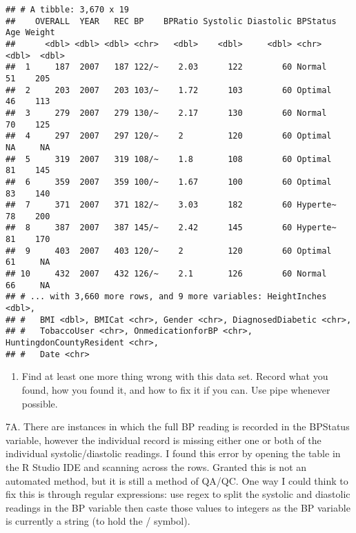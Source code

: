 \documentclass[
]{article}
\newenvironment{Shaded}{\begin{snugshade}}{\end{snugshade}}
\newcommand{\KeywordTok}[1]{\textcolor[rgb]{0.13,0.29,0.53}{\textbf{#1}}}
\newcommand{\NormalTok}[1]{#1}
\newcommand{\OperatorTok}[1]{\textcolor[rgb]{0.81,0.36,0.00}{\textbf{#1}}}
\newcommand{\StringTok}[1]{\textcolor[rgb]{0.31,0.60,0.02}{#1}}
\providecommand{\tightlist}{%
  \setlength{\itemsep}{0pt}\setlength{\parskip}{0pt}}
\begin{document}
\begin{Shaded}
\end{Shaded}

\begin{verbatim}
## # A tibble: 3,670 x 19
##    OVERALL  YEAR   REC BP    BPRatio Systolic Diastolic BPStatus   Age Weight
##      <dbl> <dbl> <dbl> <chr>   <dbl>    <dbl>     <dbl> <chr>    <dbl>  <dbl>
##  1     187  2007   187 122/~    2.03      122        60 Normal      51    205
##  2     203  2007   203 103/~    1.72      103        60 Optimal     46    113
##  3     279  2007   279 130/~    2.17      130        60 Normal      70    125
##  4     297  2007   297 120/~    2         120        60 Optimal     NA     NA
##  5     319  2007   319 108/~    1.8       108        60 Optimal     81    145
##  6     359  2007   359 100/~    1.67      100        60 Optimal     83    140
##  7     371  2007   371 182/~    3.03      182        60 Hyperte~    78    200
##  8     387  2007   387 145/~    2.42      145        60 Hyperte~    81    170
##  9     403  2007   403 120/~    2         120        60 Optimal     61     NA
## 10     432  2007   432 126/~    2.1       126        60 Normal      66     NA
## # ... with 3,660 more rows, and 9 more variables: HeightInches <dbl>,
## #   BMI <dbl>, BMICat <chr>, Gender <chr>, DiagnosedDiabetic <chr>,
## #   TobaccoUser <chr>, OnmedicationforBP <chr>, HuntingdonCountyResident <chr>,
## #   Date <chr>
\end{verbatim}

\begin{enumerate}
\def\labelenumi{\arabic{enumi}.}
\setcounter{enumi}{6}
\tightlist
\item
  Find at least one more thing wrong with this data set. Record what you
  found, how you found it, and how to fix it if you can. Use pipe
  whenever possible.
\end{enumerate}

7A. There are instances in which the full BP reading is recorded in the
BPStatus variable, however the individual record is missing either one
or both of the individual systolic/diastolic readings. I found this
error by opening the table in the R Studio IDE and scanning across the
rows. Granted this is not an automated method, but it is still a method
of QA/QC. One way I could think to fix this is through regular
expressions: use regex to split the systolic and diastolic readings in
the BP variable then caste those values to integers as the BP variable
is currently a string (to hold the / symbol).
\end{document}
